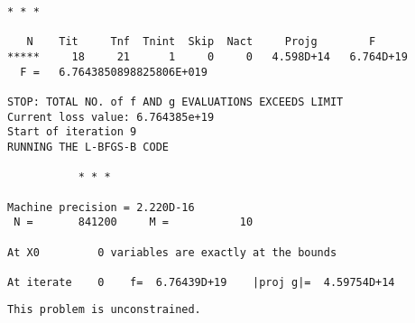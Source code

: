 \documentclass[11pt]{article}
\begin{document}
\begin{Verbatim}[commandchars=\\\{\}]
           * * *

   N    Tit     Tnf  Tnint  Skip  Nact     Projg        F
*****     18     21      1     0     0   4.598D+14   6.764D+19
  F =   6.7643850898825806E+019

STOP: TOTAL NO. of f AND g EVALUATIONS EXCEEDS LIMIT
Current loss value: 6.764385e+19
Start of iteration 9
RUNNING THE L-BFGS-B CODE

           * * *

Machine precision = 2.220D-16
 N =       841200     M =           10

At X0         0 variables are exactly at the bounds

At iterate    0    f=  6.76439D+19    |proj g|=  4.59754D+14
    \end{Verbatim}

    \begin{Verbatim}[commandchars=\\\{\}]
 This problem is unconstrained.
    \end{Verbatim}
\end{document}
